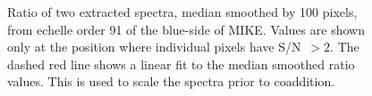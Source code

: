 \documentclass[12pt,preprint]{aastex}
\begin{document}
\begin{figure}
\caption{Ratio of two extracted spectra, median smoothed by
100 pixels,  from echelle order 91 of the blue-side of MIKE.
Values are shown only at the position where individual pixels 
have S/N~$>2$. The dashed red line shows a linear fit to the
median smoothed ratio values.
This is used to scale the spectra prior to coaddition.
}
\label{fig:hsnpix}
\end{figure}
\end{document}
